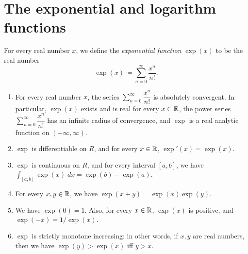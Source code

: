 \section{The exponential and logarithm functions}\label{ii:sec:4.5}

\begin{defn}\label{ii:4.5.1}
  For every real number \(x\), we define the \emph{exponential function} \(\exp(x)\) to be the real number
  \[
    \exp(x) \coloneqq \sum_{n = 0}^\infty \dfrac{x^n}{n!}.
  \]
\end{defn}

\begin{thm}\label{ii:4.5.2}
  \quad
  \begin{enumerate}
    \item\label{ii:4.5.2.a} For every real number \(x\), the series \(\sum_{n = 0}^\infty \dfrac{x^n}{n!}\) is absolutely convergent.
    In particular, \(\exp(x)\) exists and is real for every \(x \in \mathbb{R}\), the power series \(\sum_{n = 0}^\infty \dfrac{x^n}{n!}\) has an infinite radius of convergence, and \(\exp\) is a real analytic function on \((-\infty, \infty)\).
    \item\label{ii:4.5.2.b} \(\exp\) is differentiable on \(R\), and for every \(x \in \mathbb{R}\), \(\exp'(x) = \exp(x)\).
    \item\label{ii:4.5.2.c} \(\exp\) is continuous on \(R\), and for every interval \([a, b]\), we have \(\int_{[a, b]} \exp(x) \; dx = \exp(b) - \exp(a)\).
    \item\label{ii:4.5.2.d} For every \(x, y \in \mathbb{R}\), we have \(\exp(x + y) = \exp(x) \exp(y)\).
    \item\label{ii:4.5.2.e} We have \(\exp(0) = 1\).
    Also, for every \(x \in \mathbb{R}\), \(\exp(x)\) is positive, and \(\exp(-x) = 1 / \exp(x)\).
    \item\label{ii:4.5.2.f} \(\exp\) is strictly monotone increasing:
    in other words, if \(x, y\) are real numbers, then we have \(\exp(y) > \exp(x)\) iff \(y > x\).
  \end{enumerate}
\end{thm}

